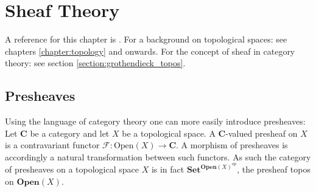 \chapter{Sheaf Theory}\label{chapter:sheaf}

    A reference for this chapter is \cite{brylinski}. For a background on topological spaces: see chapters \ref{chapter:topology} and onwards. For the concept of sheaf in category theory: see section \ref{section:grothendieck_topos}.

\section{Presheaves}



    \begin{adefinition}
        Using the language of category theory one can more easily introduce presheaves: Let $\mathbf{C}$ be a category and let $X$ be a topological space. A $\mathbf{C}$-valued presheaf on $X$ is a contravariant functor $\mathcal{F}:\text{Open}(X)\rightarrow\mathbf{C}$. A morphism of presheaves is accordingly a natural transformation between such functors. As such the category of presheaves on a topological space $X$ is in fact $\textbf{Set}^{\textbf{Open}(X)^{op}}$, the presheaf topos on $\textbf{Open}(X)$.
    \end{adefinition}

